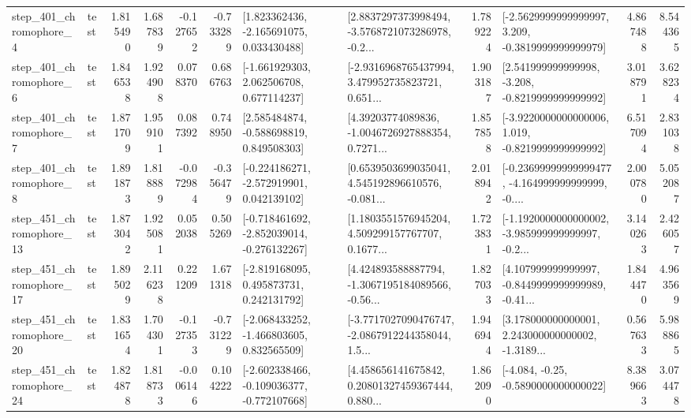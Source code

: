 \begin{tabular}{llrrrrllrlrr}
   step\_401\_chromophore\_4 &      test &      1.815490 &    1.687839 &     -0.127652 & -0.733289 &    [1.823362436, -2.165691075, 0.033430488] &  [2.8837297373998494, -3.5768721073286978, -0.2... &       1.789224 &  [-2.5629999999999997, 3.209, -0.3819999999999979] &            4.867488 &          8.544365 \\
   step\_401\_chromophore\_6 &      test &      1.846538 &    1.924908 &      0.078370 &  0.686763 &    [-1.661929303, 2.062506708, 0.677114237] &  [-2.9316968765437994, 3.479952735823721, 0.651... &       1.903187 &   [2.541999999999998, -3.208, -0.8219999999999992] &            3.018791 &          3.628234 \\
   step\_401\_chromophore\_7 &      test &      1.871709 &    1.959101 &      0.087392 &  0.748950 &    [2.585484874, -0.588698819, 0.849508303] &  [4.39203774089836, -1.0046726927888354, 0.7271... &       1.857858 &  [-3.9220000000000006, 1.019, -0.8219999999999992] &            6.517094 &          2.831038 \\
   step\_401\_chromophore\_8 &      test &      1.891873 &    1.818889 &     -0.072984 & -0.356479 &   [-0.224186271, -2.572919901, 0.042139102] &  [0.6539503699035041, 4.545192896610576, -0.081... &       2.018942 &  [-0.23699999999999477, -4.164999999999999, -0.... &            2.000780 &          5.052087 \\
  step\_451\_chromophore\_13 &      test &      1.873042 &    1.925081 &      0.052038 &  0.505269 &  [-0.718461692, -2.852039014, -0.276132267] &  [1.1803551576945204, 4.509299157767707, 0.1677... &       1.723831 &  [-1.1920000000000002, -3.985999999999997, -0.2... &            3.140263 &          2.426057 \\
  step\_451\_chromophore\_17 &      test &      1.895029 &    2.116238 &      0.221209 &  1.671318 &    [-2.819168095, 0.495873731, 0.242131792] &  [4.424893588887794, -1.3067195184089566, -0.56... &       1.827033 &  [4.107999999999997, -0.8449999999999989, -0.41... &            1.844470 &          4.963569 \\
  step\_451\_chromophore\_20 &      test &      1.831654 &    1.704301 &     -0.127353 & -0.731229 &   [-2.068433252, -1.466803605, 0.832565509] &  [-3.7717027090476747, -2.0867912244358044, 1.5... &       1.946944 &  [3.178000000000001, 2.243000000000002, -1.3189... &            0.567633 &          5.988865 \\
  step\_451\_chromophore\_24 &      test &      1.824878 &    1.818733 &     -0.006146 &  0.104222 &  [-2.602338466, -0.109036377, -0.772107668] &  [4.458656141675842, 0.20801327459367444, 0.880... &       1.862090 &               [-4.084, -0.25, -0.5890000000000022] &            8.389663 &          3.074478 \\

\end{tabular}
